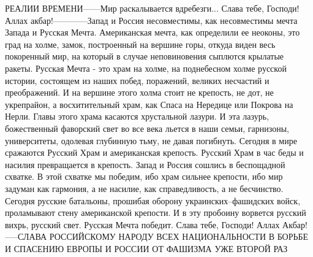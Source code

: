 РЕАЛИИ ВРЕМЕНИ------Мир раскалывается вдребезги... Слава тебе, Господи! Аллах акбар!------------Запад и Россия несовместимы, как несовместимы мечта Запада и Русская
Мечта. Американская мечта, как определили ее неоконы, это град на холме,
замок, построенный на вершине горы, откуда виден весь покоренный мир,
на который в случае неповиновения сыплются крылатые ракеты.
Русская
Мечта - это храм на холме, на поднебесном холме русской истории,
состоящем из наших побед, поражений, великих несчастий и преображений. И
на вершине этого холма стоит не крепость, не дот, не укрепрайон, а
восхитительный храм, как Спаса на Нередице или Покрова на Нерли. Главы
этого храма касаются хрустальной лазури. И эта лазурь, божественный
фаворский свет во все века льется в наши семьи, гарнизоны, университеты,
одолевая глубинную тьму, не давая погибнуть.
Сегодня в мире
сражаются Русский Храм и американская крепость. Русский Храм в час беды и
насилия превращается в крепость. Запад и Россия сошлись в беспощадной
схватке. В этой схватке мы победим, ибо храм сильнее крепости, ибо мир
задуман как гармония, а не насилие, как справедливость, а не бесчинство.
Сегодня
русские батальоны, прошибая оборону украинских--фашидских войск, проламывают стену
американской крепости. И в эту пробоину ворвется русский вихрь, русский
свет. Русская Мечта победит. Слава тебе, Господи! Аллах Акбар!-----СЛАВА РОССИЙСКОМУ НАРОДУ ВСЕХ НАЦИОНАЛЬНОСТИ В БОРЬБЕ И СПАСЕНИЮ ЕВРОПЫ И РОССИИ ОТ ФАШИЗМА УЖЕ ВТОРОЙ РАЗ

